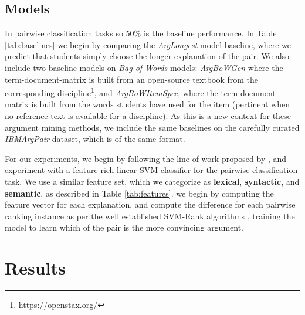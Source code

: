 \documentclass[runningheads]{llncs}
\begin{document}
\subsection{Models}


%	
%	


In pairwise classification tasks so 50\% is the baseline performance.  
In Table \ref{tab:baselines} we begin by comparing the \textit{ArgLongest} 
model baseline, where we predict that students simply choose the longer 
explanation of the pair.
We also include two baseline models on \textit{Bag of Words} models: 
\textit{ArgBoWGen} where the term-document-matrix is built from an open-source 
textbook from the corresponding discipline\footnote{https://openstax.org/}, and 
\textit{ArgBoWItemSpec}, where the term-document matrix is built from the words 
students have used for the item (pertinent when no reference text is available 
for a discipline).
As this is a new context for these argument mining methods, we include the same 
baselines on the carefully curated \textit{IBMArgPair} dataset, which is of the 
same format.



For our experiments, we begin by following the line of work proposed by 
\cite{habernal_which_2016}, and experiment with a feature-rich linear SVM 
classifier for the pairwise classification task. We use a similar feature set, 
which we categorize as \textbf{lexical}, \textbf{syntactic}, and 
\textbf{semantic}, as described in Table \ref{tab:features}. we begin by 
computing the feature vector for each explanation, and compute the difference 
for each pairwise ranking instance as per the well established SVM-Rank 
algorithms \cite{joachims_optimizing_2002}, training the model to learn which 
of the pair is the more convincing argument. 


\section{Results}
%		
%		
\end{document}
